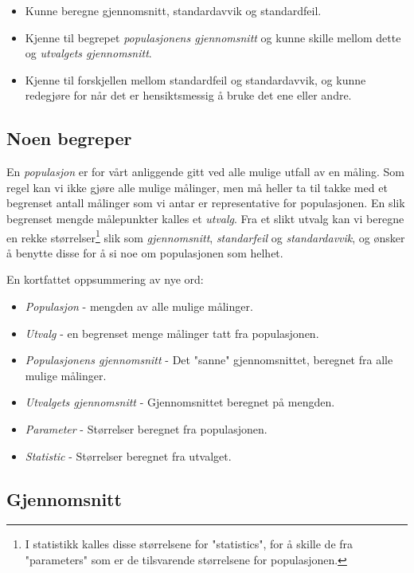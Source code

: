 \documentclass[a4paper,9pt]{article}
\begin{document}
\begin{itemize}
\item Kunne beregne gjennomsnitt, standardavvik og standardfeil.
\item Kjenne til begrepet \emph{populasjonens gjennomsnitt} og kunne skille mellom dette og \emph{utvalgets gjennomsnitt}.
\item Kjenne til forskjellen mellom standardfeil og standardavvik, og kunne redegjøre for når det er hensiktsmessig å bruke det ene eller andre.
\end{itemize}

\subsection{Noen begreper}

En \emph{populasjon} er for vårt anliggende gitt ved alle mulige utfall av en måling. Som regel kan vi ikke gjøre alle mulige målinger, men må heller ta til takke med et begrenset antall målinger som vi antar er representative for populasjonen. En slik begrenset mengde målepunkter kalles et \emph{utvalg}. 
Fra et slikt utvalg kan vi beregne en rekke størrelser\footnote{I statistikk kalles disse størrelsene for "statistics", for å skille de fra "parameters" som er de tilsvarende størrelsene for populasjonen.} slik som \emph{gjennomsnitt}, \emph{standarfeil} og \emph{standardavvik}, og ønsker å benytte disse for å si noe om populasjonen som helhet.

\vspace{.5cm}

En kortfattet oppsummering av nye ord:
\begin{itemize}
\item \emph{Populasjon} - mengden av alle mulige målinger.
\item \emph{Utvalg} - en begrenset menge målinger tatt fra populasjonen.
\item \emph{Populasjonens gjennomsnitt} - Det "sanne" gjennomsnittet, beregnet fra alle mulige målinger.
\item \emph{Utvalgets gjennomsnitt} - Gjennomsnittet beregnet på mengden.
\item \emph{Parameter} - Størrelser beregnet fra populasjonen.
\item \emph{Statistic} - Størrelser beregnet fra utvalget.
\end{itemize}

\subsection{Gjennomsnitt}
\end{document}
